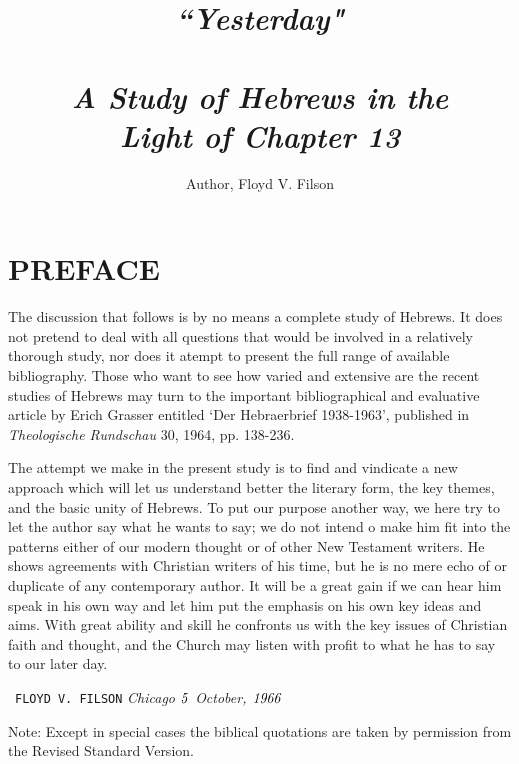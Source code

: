 \documentclass{book}
\author{
  Author, Floyd V. Filson\\
}
\begin{document}
\title{\centering \textit{\textbf{\Huge ``Yesterday"}\\ ~ \\
                          { A Study of Hebrews in the}\\
                          { Light of Chapter 13}}}
\date{}
\maketitle

\LARGE

\chapter*{PREFACE}
The discussion that follows is by no means a complete study of Hebrews.
It does not pretend to deal with all questions that would be involved in a
relatively thorough study, nor does it atempt to present the full range of
available bibliography.
Those who want to see how varied and extensive are the recent studies of
Hebrews may turn to the important bibliographical and evaluative article by
Erich Grasser entitled `Der Hebraerbrief 1938-1963', published in
{\it Theologische Rundschau} 30, 1964, pp. 138-236.

The attempt we make in the present study is to find and vindicate a new
approach which will let us understand better the literary form, the key themes,
and the basic unity of Hebrews.
To put our purpose another way, we here try to let the author say what he wants
to say; we do not intend o make him fit into the patterns either of our modern
thought or of other New Testament writers.
He shows agreements with Christian writers of his time, but he is no mere echo
of or duplicate of any contemporary author.
It will be a great gain if we can hear him speak in his own way and let him put
the emphasis on his own key ideas and aims.
With great ability and skill he confronts us with the key issues of Christian
faith and thought, and the Church may listen with profit to what he has to say
to our later day.
\newline

\hfill~\texttt{FLOYD V. FILSON}
\newline
{\it Chicago}
\newline
{\it $\it 5$ October, $\it 1966$}
\newline

Note: Except in special cases the biblical quotations are taken by permission
from the Revised Standard Version.
\end{document}
